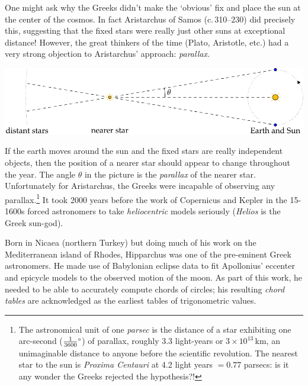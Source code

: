 One might ask why the Greeks didn't make the `obvious' fix and place the sun at the center of the cosmos. In fact Aristarchus of Samos (c.\,310--230\BC) did precisely this, suggesting that the fixed stars were really just other suns at exceptional distance! However, the great thinkers of the time (Plato, Aristotle, etc.) had a very strong objection to Aristarchus' approach: \emph{parallax.}
\begin{center}
	\includegraphics{trig-parallax}
\end{center}
If the earth moves around the sun and the fixed stars are really independent objects, then the position of a nearer star should appear to change throughout the year. The angle $\theta$ in the picture is the \emph{parallax} of the nearer star. Unfortunately for Aristarchus, the Greeks were incapable of observing any parallax.\footnote{The astronomical unit of one \emph{parsec} is the distance of a star exhibiting one arc-second ($\ang{\frac 1{3600}}$) of parallax, roughly 3.3 light-years or $3\times 10^{13}$\,km, an unimaginable distance to anyone before the scientific revolution. The nearest star to the sun is \emph{Proxima Centauri} at 4.2 light years $=0.77$ parsecs: is it any wonder the Greeks rejected the hypothesis?!}
It took 2000 years before the work of Copernicus and Kepler in the 15-1600s forced astronomers to take \emph{heliocentric} models seriously (\emph{Helios} is the Greek sun-god).
\goodbreak



Born in Nicaea (northern Turkey) but doing much of his work on the Mediterranean island of Rhodes, Hipparchus was one of the pre-eminent Greek astronomers. He made use of Babylonian eclipse data to fit Apollonius' eccenter and epicycle models to the observed motion of the moon. As part of this work, he needed to be able to accurately compute chords of circles; his resulting \emph{chord tables} are acknowledged as the earliest tables of trigonometric values.\par

